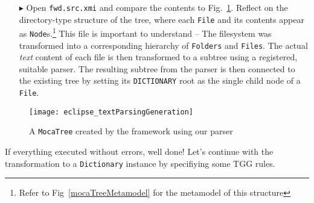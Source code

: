 \begin{itemize}

\item[$\blacktriangleright$] Open \texttt{fwd.src.xmi} and compare the contents to Fig.~\ref{eclipse:treeResult}. Reflect on the directory-type structure of the
tree, where each \texttt{File} and its contents appear as \texttt{Node}s.\footnote{Refer to Fig~\ref{mocaTreeMetamodel} for the metamodel of this structure}
This file is important to understand -- The filesystem was transformed into a corresponding hierarchy of \texttt{Folders} and \texttt{Files}. The actual
\emph{text} content of each file is then transformed to a subtree using a registered, suitable parser. The resulting subtree from the parser is then connected
to the existing tree by setting its \texttt{DICTIONARY} root as the single child node of a \texttt{File}.

\end{itemize}

\vspace{0.5cm}

\begin{figure}[!htbp]
\begin{center}
 \texttt{[image: eclipse\_textParsingGeneration]}
  \caption{A \texttt{MocaTree} created by the framework using our parser}
  \label{eclipse:treeResult}
\end{center}
\end{figure}

If everything executed without errors, well done! Let's continue with the transformation to a \texttt{Dictionary} instance by specifiying some
TGG rules.
